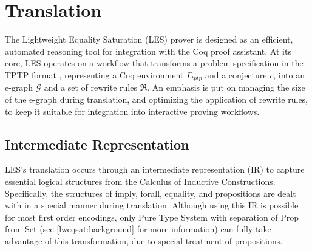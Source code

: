 \section{Translation}
\label{les:ir}



The Lightweight Equality Saturation (LES) prover is designed as an efficient, automated reasoning tool for integration with the Coq proof assistant. 
At its core, LES operates on a workflow that transforms a problem specification in the TPTP format \cite{sutcliffe2017tptp}, representing a Coq environment $\Gamma_{tptp}$ and a conjecture $c$, into an e-graph $\mathcal{G}$ and a set of rewrite rules $\Re$.
An emphasis is put on managing the size of the e-graph during translation, and optimizing the application of rewrite rules, to keep it suitable for integration into interactive proving workflows.

\subsection{Intermediate Representation}

LES's translation occurs through an intermediate representation (IR) to capture essential logical structures from the Calculus of Inductive Constructions.
Specifically, the structures of imply, forall, equality, and propositions are dealt with in a special manner during translation.
Although using this IR is possible for most first order encodings, only Pure Type System with separation of Prop from Set (see \autoref{lweqsat:background} for more information) can fully take advantage of this transformation, due to special treatment of propositions.


